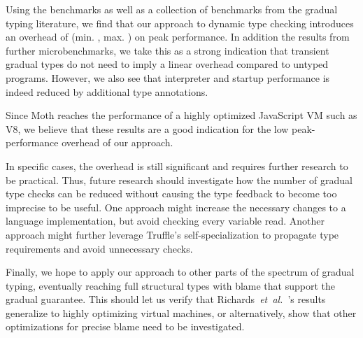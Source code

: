 Using the \AWFY benchmarks as well as a collection of benchmarks from the
gradual typing literature, we find that our approach to dynamic type checking
introduces an overhead of 
\OverheadTypingGMeanP (min. \OverheadTypingMinP, max. \OverheadTypingMaxP)
on peak performance.
In addition the results from further microbenchmarks,
we take this as a strong indication that transient gradual types do not
need to imply a linear overhead compared to untyped programs.
However, we also see that interpreter and startup performance is indeed
reduced by additional type annotations.

  
  

Since Moth reaches the performance of a
highly optimized JavaScript VM such as V8,
we believe that these results are a good indication
for the low peak-performance overhead of our approach.


In specific cases, the overhead is still significant and requires further
research to be practical. Thus, future research should investigate how the
number of gradual type checks can be reduced without causing
the type feedback to become too imprecise to be useful.
One approach might increase the necessary changes to a language implementation,
but avoid checking every variable read.
Another approach might further leverage Truffle's self-specialization
to propagate type requirements and avoid unnecessary checks.

Finally, we hope to apply our approach to other parts of the spectrum
of gradual typing, eventually reaching 
full structural types with
blame that support the gradual guarantee.  
This should let us verify that
Richards~\textit{et~al.}~\cite{Richards2017}'s results generalize to highly optimizing virtual
machines, or alternatively, show that other optimizations for precise
blame need to be investigated.

